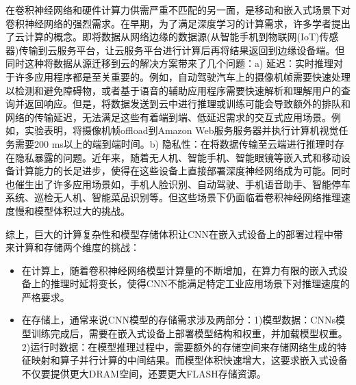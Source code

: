 在卷积神经网络和硬件计算力供需严重不匹配的另一面，是移动和嵌入式场景下对卷积神经网络的强烈需求。在早期，为了满足深度学习的计算需求，许多学者提出了云计算的概念。即将数据从网络边缘的数据源(从智能手机到物联网(IoT)传感器)传输到云服务平台，让云服务平台进行计算后再将结果返回到边缘设备端。但同时这种将数据从源迁移到云的解决方案带来了几个问题：a) 延迟：实时推理对于许多应用程序都是至关重要的。例如，自动驾驶汽车上的摄像机帧需要快速处理以检测和避免障碍物，或者基于语音的辅助应用程序需要快速解析和理解用户的查询并返回响应。但是，将数据发送到云中进行推理或训练可能会导致额外的排队和网络的传输延迟，无法满足这些有着端到端、低延迟需求的交互式应用场景。例如，实验表明，将摄像机帧offload到Amazon Web服务服务器并执行计算机视觉任务需要200 ms以上的端到端时间。b) 隐私性：在将数据传输至云端进行推理时存在隐私暴露的问题。近年来，随着无人机、智能手机、智能眼镜等嵌入式和移动设备计算能力的长足进步，使得在这些设备上直接部署深度神经网络成为可能。同时也催生出了许多应用场景如，手机人脸识别、自动驾驶、手机语音助手、智能停车系统、巡检无人机、智能菜品识别等。但这些场景下仍面临着卷积神经网络推理速度慢和模型体积过大的挑战。

综上，巨大的计算复杂性和模型存储体积让CNN在嵌入式设备上的部署过程中带来计算和存储两个维度的挑战：
\begin{itemize}
	\item 在计算上，随着卷积神经网络模型计算量的不断增加，在算力有限的嵌入式设备上的推理时延将变长，使得CNN不能满足特定工业应用场景下对推理速度的严格要求。
	\item 在存储上，通常来说CNN模型的存储需求涉及两部分\cite{liu2017learning,ren2019multi}：1)模型数据：CNNs模型训练完成后，需要在嵌入式设备上部署模型结构和权重，并加载模型权重。2)运行时数据：在模型推理过程中，需要额外的存储空间来存储网络生成的特征映射和算子并行计算的中间结果。而模型体积快速增大，这要求嵌入式设备不仅要提供更大DRAM空间，还要更大FLASH存储资源。
\end{itemize}


